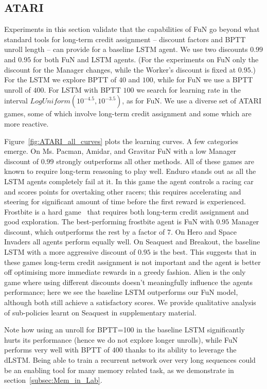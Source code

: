 \subseckiny
\subsection{ATARI}
\subseckiny
\label{subsec:atari}

Experiments in this section validate that the capabilities of FuN go beyond what standard tools for long-term credit assignment -- discount factors and BPTT unroll length -- can provide for a baseline LSTM agent.
We use two discounts $0.99$ and $0.95$ for both FuN and LSTM agents. (For the experiments on FuN only the discount for the Manager changes, while the Worker's discount is fixed at $0.95$.) For the LSTM we explore BPTT of $40$ and $100$, while for FuN we use a BPTT unroll of $400$. For LSTM with BPTT $100$ we search for learning rate in the interval  $\mathit{LogUniform}(10^{-4.5},10^{-3.5})$, as for FuN. We use a diverse set of ATARI games, some of which involve long-term credit assignment and some which are more reactive. 

Figure~\ref{fig:ATARI_all_curves} plots the learning curves. A few categories emerge. On Ms. Pacman, Amidar, and Gravitar FuN with a low Manager discount of $0.99$ strongly outperforms all other methods. All of these games are known to require long-term reasoning to play well. Enduro stands out as all the LSTM agents completely fail at it. In this game the agent controls a racing car and scores points for overtaking other racers; this requires accelerating and steering for significant amount of time before the first reward is experienced. Frostbite is a hard game~\cite{vezhnevets2016straw, lake2016likehumans} that requires both long-term credit assignment and good exploration. The best-performing frostbite agent is FuN with $0.95$ Manager discount, which outperforms the rest by a factor of 7. On Hero and Space Invaders all agents perform equally well. 
%
On Seaquest and Breakout, the baseline LSTM with a more aggressive discount of $0.95$ is the best. This suggests that in these games long-term credit assignment is not important and the agent is better off optimising more immediate rewards in a greedy fashion. Alien is the only game where using different discounts doesn't meaningfully influence the agents performance; here we see the baseline LSTM outperforms our FuN model, although both still achieve a satisfactory scores. We provide qualitative analysis of sub-policies learnt on Seaquest in supplementary material.

Note how using an unroll for BPTT=100 in the baseline LSTM significantly hurts its performance (hence we do not explore longer unrolls), while FuN performs very well with BPTT of $400$ thanks to its ability to leverage the dLSTM. 
Being able to train a recurrent network over very long sequences could be an enabling tool for many memory related task, as we demonstrate in section~\ref{subsec:Mem_in_Lab}. 

